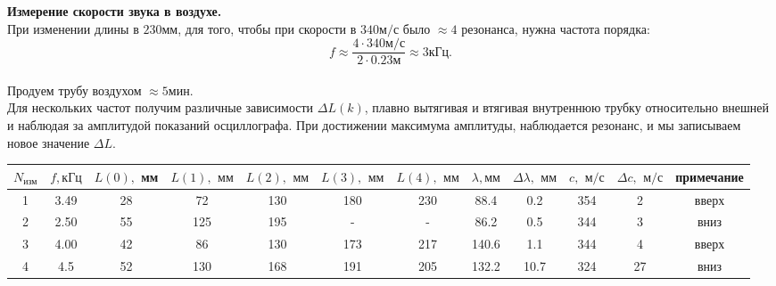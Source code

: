 \documentclass[12pt,a4paper]{article}
\begin{document}
\textbf{Измерение скорости звука в воздухе.}\\
При изменении длины в $230 \text{мм}$, для того, чтобы при скорости в $340\text{м}/\text{с}$ было $\approx 4$ резонанса, нужна частота порядка:
$$f \approx \frac{4\cdot340\text{м}/\text{с}}{2 \cdot 0.23 \text{м}} \approx 3\text{кГц}.$$\\
Продуем трубу воздухом $\approx 5 \text{мин}$.\\
Для нескольких частот получим различные зависимости $\Delta L(k)$, плавно вытягивая и втягивая внутреннюю трубку относительно внешней и наблюдая за амплитудой показаний осциллографа. При достижении максимума амплитуды, наблюдается резонанс, и мы записываем новое значение $\Delta L$.

\begin{center}
\begin{tabular}{|c|c|c|c|c|c|c|c|c|c|c|c|}
\hline $N_\text{изм}$&$f, \text{кГц}$&$L(0),$ мм&$L(1),$ $\text{мм}$&$L(2),$ $\text{мм}$&$L(3),$ $\text{мм}$&$L(4),$ $\text{мм}$&$\lambda, \text{мм}$&$\Delta \lambda,$ $\text{мм}$&$c,$ $\text{м}/\text{с}$&$\Delta c,$ $\text{м}/\text{с}$&примечание\\ \hline
1&3.49&28&72&130&180&230&88.4&0.2&354&2&вверх\\ \hline
2&2.50&55&125&195&-&-&86.2&0.5&344&3&вниз\\ \hline
3&4.00&42&86&130&173&217&140.6&1.1&344&4&вверх\\ \hline
4&4.5&52&130&168&191&205&132.2&10.7&324&27&вниз\\ \hline
\end{tabular}
\end{center}
\end{document}
